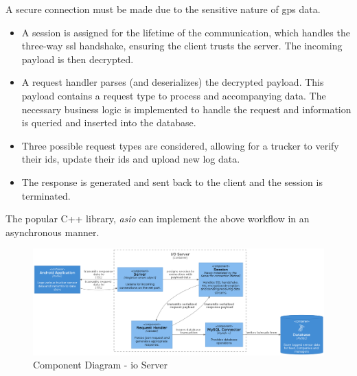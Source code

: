 A secure connection must be made due to the sensitive nature of \ac{gps} data.
\begin{itemize}
\item A session is assigned for the lifetime of the communication, which handles the three-way \ac{ssl} handshake, ensuring the client trusts the server. The incoming payload is then decrypted.
\item A request handler parses (and deserializes) the decrypted payload.
This payload contains a request type to process and accompanying data.
The necessary business logic is implemented to handle the request and information is queried and inserted into the database.
\item Three possible request types are considered, allowing for a trucker to verify their \ac{id}s, update their \ac{id}s and upload new log data.
\item The response is generated and sent back to the client and the session is terminated.
\end{itemize}

The popular C++ library, \textit{asio} can implement the above workflow in an asynchronous manner.

\begin{figure}[H]
\centering
\includegraphics[width=6in]{../diag/IO_component.png}
\caption{Component Diagram - \Ac{io} Server}
\label{fig:IO_component}
\end{figure}

